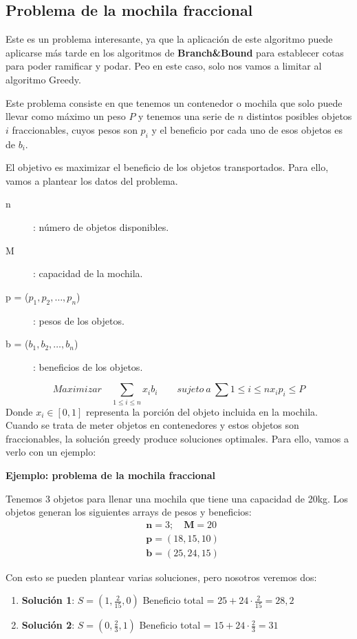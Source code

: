 \documentclass[10pt,a4paper,spanish]{report}
\theoremstyle{definition}
\theoremstyle{remark}
\begin{document}
\subsection{\textcolor{electriccrimson}Problema de la mochila fraccional}
Este es un problema interesante, ya que la aplicación de este algoritmo puede aplicarse más tarde en los algoritmos de \textbf{Branch\&Bound} para establecer cotas para poder ramificar y podar. Peo en este caso, solo nos vamos a limitar al algoritmo Greedy.

Este problema consiste en que tenemos un contenedor o mochila que solo puede llevar como máximo un peso $P$ y tenemos una serie de $n$ distintos posibles objetos $i$ fraccionables, cuyos pesos son $p_i$ y el beneficio por cada uno de esos objetos es de $b_i$.

El objetivo es maximizar el beneficio de los objetos transportados. Para ello, vamos a plantear los datos del problema.
\begin{description}
    \item[n]: número de objetos disponibles.
    \item[M]: capacidad de la mochila.
    \item[p = ($p_1,p_2,\ldots,p_n$)]: pesos de los objetos.
    \item[b = ($b_1,b_2,\ldots,b_n$)]: beneficios de los objetos.
\end{description}
\begin{displaymath}
    Maximizar \quad \sum_{1\leq i\leq n}x_ib_i \qquad sujeto~a~\sum{1 \leq i \leq n} x_i p_i \leq P
\end{displaymath}
Donde $x_i \in [0,1]$ representa la porción del objeto incluida en la mochila. Cuando se trata de meter objetos en contenedores y estos objetos son fraccionables, la solución greedy produce soluciones optimales. Para ello, vamos a verlo con un ejemplo:

 \textbf{\textcolor{electriccrimson}{Ejemplo:} problema de la mochila fraccional}

 Tenemos 3 objetos para llenar una mochila que tiene una capacidad de 20kg. Los objetos generan los siguientes arrays de pesos y beneficios:
 \begin{align*}
    &\mathbf{n} = 3; \quad \mathbf{M} = 20\\
    &\mathbf{p}=(18,15,10)\\
    &\mathbf{b}=(25,24,15)
 \end{align*}
    
Con esto se pueden plantear varias soluciones, pero nosotros veremos dos:
\begin{enumerate}[$\blacksquare$]
    \item \textbf{Solución 1}: $S=\left(1, \frac{2}{15}, 0\right)$
    Beneficio total = $25 +24 \cdot \frac{2}{15} = 28,2$
    \item \textbf{Solución 2}: $S=\left(0, \frac{2}{3}, 1\right)$
    Beneficio total = $15+24\cdot\frac{2}{3}=31$
\end{enumerate}
\end{document}
